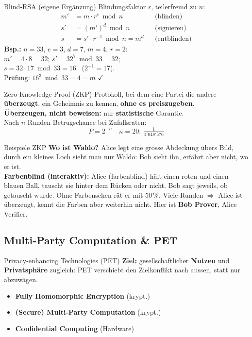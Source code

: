 \documentclass[a4paper, fontsize=7pt]{scrartcl}
\begin{document}
\begin{subbox}{Blind-RSA (eigene Ergänzung)}
Blindungsfaktor $r$, teilerfremd zu $n$:
\begin{align*}
m' &= m \cdot r^e \bmod n & &\text{(blinden)}\\
s' &= (m')^d \bmod n & &\text{(signieren)}\\
s &= s' \cdot r^{-1} \bmod n = m^d & &\text{(entblinden)}
\end{align*}
\textbf{Bsp.:} $n = 33$, $e = 3$, $d = 7$, $m = 4$, $r = 2$:\\
$m' = 4 \cdot 8 = 32$; $s' = 32^7 \bmod 33 = 32$;\\
$s = 32 \cdot 17 \bmod 33 = 16$ \ ($2^{-1} = 17$).\\
Prüfung: $16^3 \bmod 33 = 4 = m$ $\checkmark$
\end{subbox}

\begin{mainbox}{Zero-Knowledge Proof (ZKP)}
Protokoll, bei dem eine Partei die andere \textbf{überzeugt}, ein Geheimnis zu
kennen, \textbf{ohne es preiszugeben}.\\
\textbf{Überzeugen, nicht beweisen:} nur \textbf{statistische} Garantie.\\
Nach $n$ Runden Betrugschance bei Zufallsraten:
$$\boxed{P = 2^{-n}}\quad n = 20:\ \tfrac{1}{1'048'576}$$
\end{mainbox}

\begin{subbox}{Beispiele ZKP}
\textbf{Wo ist Waldo?} Alice legt eine grosse Abdeckung übers Bild, durch ein
kleines Loch sieht man nur Waldo: Bob sieht ihn, erfährt aber nicht, wo er ist.\\[2pt]
\textbf{Farbenblind (interaktiv):} Alice (farbenblind) hält einen roten und einen
blauen Ball, tauscht sie hinter dem Rücken oder nicht. Bob sagt jeweils, ob getauscht
wurde. Ohne Farbensehen rät er mit 50\,\%. Viele Runden $\Rightarrow$ Alice ist
überzeugt, kennt die Farben aber weiterhin nicht. Hier ist \textbf{Bob Prover},
Alice Verifier.
\end{subbox}

\subsection{Multi-Party Computation \& PET}

\begin{mainbox}{Privacy-enhancing Technologies (PET)}
\textbf{Ziel:} gesellschaftlicher \textbf{Nutzen} und \textbf{Privatsphäre}
zugleich: PET verschiebt den Zielkonflikt nach aussen, statt nur abzuwägen.
\begin{itemize}
    \item \textbf{Fully Homomorphic Encryption} (krypt.)
    \item \textbf{(Secure) Multi-Party Computation} (krypt.)
    \item \textbf{Confidential Computing} (Hardware)
\end{itemize}
\end{mainbox}
\end{document}
